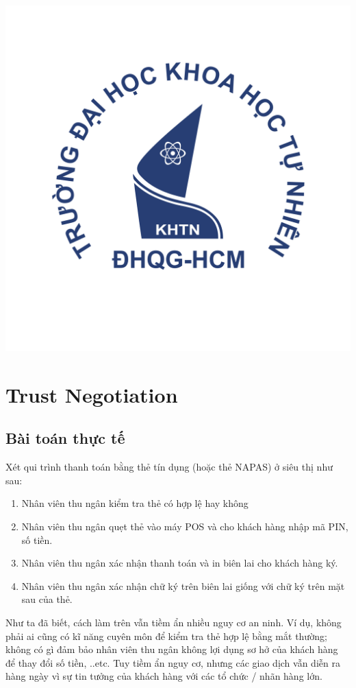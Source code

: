 \documentclass[12pt]{article}
\begin{document}
\begin{titlepage}
\includegraphics[scale=.25]{img/hcmus-logo.png}\\[1cm]

\vfill
\end{titlepage}
	
\tableofcontents
\pagebreak

\section{Trust Negotiation}
\subsection{Bài toán thực tế}
Xét qui trình thanh toán bằng thẻ tín dụng (hoặc thẻ NAPAS) ở siêu thị như sau:
\begin{enumerate}
\item Nhân viên thu ngân kiểm tra thẻ có hợp lệ hay không
\item Nhân viên thu ngân quẹt thẻ vào máy POS và cho khách hàng nhập mã PIN, số tiền.
\item Nhân viên thu ngân xác nhận thanh toán và in biên lai cho khách hàng ký.
\item Nhân viên thu ngân xác nhận chữ ký trên biên lai giống với chữ ký trên mặt sau của thẻ.
\end{enumerate}
Như ta đã biết, cách làm trên vẫn tiềm ẩn nhiều nguy cơ an ninh. Ví dụ, không phải ai cũng có kĩ năng cuyên môn để kiểm tra thẻ hợp lệ bằng mắt thường; không có gì đảm bảo nhân viên thu ngân không lợi dụng sơ hở của khách hàng để thay đổi số tiền, ..etc. Tuy tiềm ẩn nguy cơ, nhưng các giao dịch vẫn diễn ra hàng ngày vì sự tin tưởng của khách hàng với các tổ chức / nhãn hàng lớn.
\end{document}
